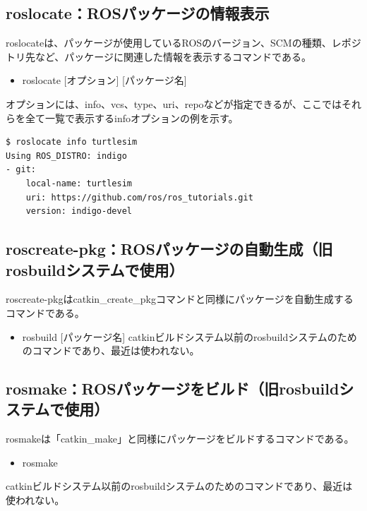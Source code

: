 \subsection{roslocate：ROSパッケージの情報表示}

roslocateは、パッケージが使用しているROSのバージョン、SCMの種類、レポジトリ先など、パッケージに関連した情報を表示するコマンドである。

\begin{itemize}
\item roslocate [オプション] [パッケージ名]
\end{itemize}

オプションには、info、vcs、type、uri、repoなどが指定できるが、ここではそれらを全て一覧で表示するinfoオプションの例を示す。

\begin{lstlisting}[language=ROS]
$ roslocate info turtlesim
Using ROS_DISTRO: indigo
- git:
    local-name: turtlesim
    uri: https://github.com/ros/ros_tutorials.git
    version: indigo-devel
\end{lstlisting}

\subsection{roscreate-pkg：ROSパッケージの自動生成（旧rosbuildシステムで使用）}

roscreate-pkgはcatkin\_create\_pkgコマンドと同様にパッケージを自動生成するコマンドである。

\begin{itemize}
\item  rosbuild [パッケージ名]
catkinビルドシステム以前のrosbuildシステムのためのコマンドであり、最近は使われない。
\end{itemize}

\subsection{rosmake：ROSパッケージをビルド（旧rosbuildシステムで使用）}

rosmakeは「catkin\_make」と同様にパッケージをビルドするコマンドである。

\begin{itemize}
\item  rosmake
\end{itemize}
catkinビルドシステム以前のrosbuildシステムのためのコマンドであり、最近は使われない。





